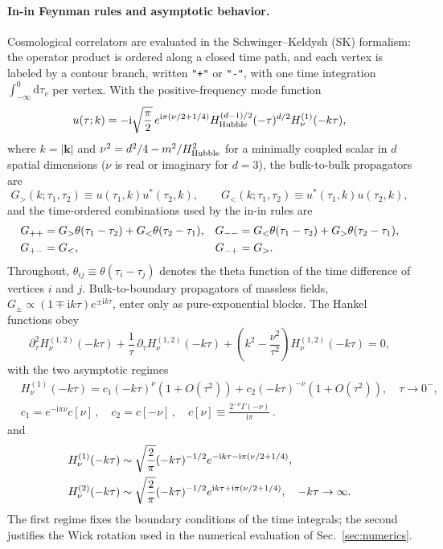 \documentclass[11pt,a4paper]{article}
\newcommand{\dd}{\mathrm d}
\newcommand{\ii}{\mathrm i}
\def\ie{\begin{equation}\begin{aligned}}
\def\fe{\end{aligned}\end{equation}}
\begin{document}
\paragraph{In-in Feynman rules and asymptotic behavior.}
Cosmological correlators are evaluated in the Schwinger--Keldysh (SK) formalism: the operator
product is ordered along a closed time path, and each vertex is labeled by a contour branch,
written \texttt{"+"} or \texttt{"-"}, with one time integration $\int_{-\infty}^0\dd\tau_v$ per
vertex. With the positive-frequency mode function
\begin{equation}
  u(\tau;k)=-\ii\sqrt{\frac{\pi}{2}}\,
  e^{\ii\pi(\nu/2+1/4)}H_{\rm Hubble}^{(d-1)/2}
  (-\tau)^{d/2}H^{(1)}_\nu(-k\tau),
  \label{eq:mode-function}
\end{equation}
where $k=|\bm k|$ and $\nu^2=d^2/4-m^2/H_{\rm Hubble}^2$ for a minimally coupled scalar in $d$
spatial dimensions ($\nu$ is real or imaginary for $d=3$), the bulk-to-bulk propagators are
\begin{equation}
  G_{>}(k;\tau_1,\tau_2)\equiv u(\tau_1,k)u^*(\tau_2,k),\qquad
  G_{<}(k;\tau_1,\tau_2)\equiv u^*(\tau_1,k)u(\tau_2,k),
  \label{eq:bulk-bulk-propagators}
\end{equation}
and the time-ordered combinations used by the in-in rules are
\begin{align}
  G_{++}&=G_{>}\theta(\tau_1-\tau_2)+G_{<}\theta(\tau_2-\tau_1),
  &G_{--}&=G_{<}\theta(\tau_1-\tau_2)+G_{>}\theta(\tau_2-\tau_1),
  \notag\\
  G_{+-}&=G_{<},
  &G_{-+}&=G_{>}.
  \label{eq:sk-propagators}
\end{align}
Throughout, $\theta_{ij}\equiv\theta(\tau_i-\tau_j)$ denotes the theta function of the time
difference of vertices $i$ and $j$. Bulk-to-boundary propagators of massless fields,
$G_\pm\propto(1\mp\ii k\tau)e^{\pm\ii k\tau}$, enter only as pure-exponential blocks. The Hankel
functions obey
\begin{equation}
  \partial_\tau^2H^{(1,2)}_\nu(-k\tau)
  +\frac1\tau\,\partial_\tau H^{(1,2)}_\nu(-k\tau)
  +\left(k^2-\frac{\nu^2}{\tau^2}\right)H^{(1,2)}_\nu(-k\tau)=0,
  \label{eq:hankel-eom}
\end{equation}
with the two asymptotic regimes
\ie
  &H^{(1)}_\nu(-k\tau)=c_1(-k\tau)^\nu(1+O(\tau^2))+c_2(-k\tau)^{-\nu}(1+O(\tau^2)),
  \quad \tau\to0^-,\\
&c_1=e^{-\ii\pi\nu}c[\nu]\,, \quad c_2=c[-\nu]\,, \quad
c[\nu]\equiv \frac{ 2^{-\nu } \Gamma (-\nu )}{\ii \pi }  \, .
  \label{eq:hankel-tau0}
\fe
and
\begin{align}
  &H^{(1)}_\nu(-k\tau)\sim\sqrt{\frac2\pi}(-k\tau)^{-1/2}
  e^{-\ii k\tau-\ii\pi(\nu/2+1/4)},\notag\\
  &H^{(2)}_\nu(-k\tau)\sim\sqrt{\frac2\pi}(-k\tau)^{-1/2}
  e^{\ii k\tau+\ii\pi(\nu/2+1/4)},
  \quad -k\tau\to\infty.
  \label{eq:hankel-infinity}
\end{align}
The first regime fixes the boundary conditions of the time integrals; the second justifies the
Wick rotation used in the numerical evaluation of Sec.~\ref{sec:numerics}.
\end{document}

